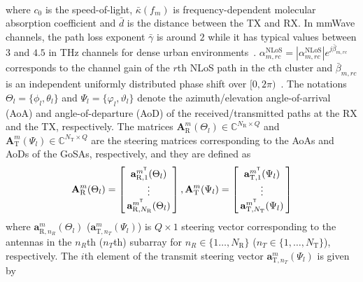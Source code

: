 \documentclass[journal,10pt]{IEEEtran}
\begin{document}
{\begin{align}
		\end{align} where $c_0$ is the speed-of-light, $\bar{\kappa}(f_m)$ is frequency-dependent molecular absorption coefficient and $\bar{d}$ is the distance between the TX and RX. In mmWave channels, the path loss exponent $\bar{\gamma}$ is around $2$ while it has typical values between $3$ and $4.5$ in THz channels for dense urban environments~\cite{teraMIMO}. 	 $\alpha^\mathrm{NLoS}_{m,rc}= |\alpha^\mathrm{NLoS}_{m,rc}| e^{j\bar{\beta}_{m,rc}} $ corresponds to the channel gain of the $r$th NLoS path in the $c$th cluster and $\bar{\beta}_{m,rc}$ is an independent uniformly distributed phase shift  over $[0,2\pi)$~\cite{teraMIMO}. The notations $\Theta_{l} = \{\phi_{l},\theta_{l}\}$ and $\Psi_{l} = \{\varphi_{l},\vartheta_{l}\}$ denote the azimuth/elevation angle-of-arrival (AoA) and angle-of-departure (AoD) of the received/transmitted paths at the RX and the TX, respectively. The matrices $\mathbf{A}_\mathrm{R}^m(\Theta_{l})\in\mathbb{C}^{N_\mathrm{R}\times Q}$ and $\mathbf{A}_\mathrm{T}^m(\Psi_{l})\in \mathbb{C}^{N_\mathrm{T}\times Q}$ are the steering matrices corresponding to the AoAs and AoDs of the GoSAs, respectively, and they are defined as
		\begin{align}
		\mathbf{A}_\mathrm{R}^m(\Theta_{l}) = \left[ \hspace{-3pt}\begin{array}{c}
		\mathbf{a}_{\mathrm{R},1}^{m^\textsf{T}}(\Theta_{l}) \\
		\vdots \\ 
		\mathbf{a}_{\mathrm{R},N_\mathrm{R}}^{m^\textsf{T}}(\Theta_{l}) \end{array} \hspace{-3pt}\right],
		\mathbf{A}_\mathrm{T}^m(\Psi_{l}) = \left[ \hspace{-3pt}\begin{array}{c}\mathbf{a}_{\mathrm{T},1}^{m^\textsf{T}}(\Psi_{l}) \\
		\vdots\\
		\mathbf{a}_{\mathrm{T},N_\mathrm{T}}^{m^\textsf{T}}(\Psi_{l}) \end{array} \hspace{-3pt}\right]
		\end{align}
		where $\mathbf{a}_{\mathrm{R},n_R}^m(\Theta_{l})$ ($\mathbf{a}_{\mathrm{T},n_T}^m(\Psi_{l}) $) is $Q\times 1$ steering vector corresponding to the antennas in the $n_R$th ($n_T$th) subarray for $n_R\in \{1\dots, N_\mathrm{R}\}$ ($n_T\in \{1,\dots, N_\mathrm{T}\}$), respectively.
		The $i$th element of the transmit steering vector $\mathbf{a}_{\mathrm{T},n_T}^m(\Psi_{l})$ is given by 
}
\end{document}
